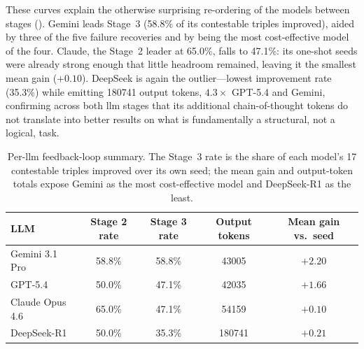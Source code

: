 These curves explain the otherwise surprising re-ordering of the models between stages (). Gemini leads Stage~3 (58.8\% of its contestable triples improved), aided by three of the five failure recoveries and by being the most cost-effective model of the four. Claude, the Stage~2 leader at 65.0\%, falls to 47.1\%: its one-shot seeds were already strong enough that little headroom remained, leaving it the smallest mean gain ($+0.10$). DeepSeek is again the outlier---lowest improvement rate (35.3\%) while emitting \num{180741} output tokens, $4.3\times$ GPT-5.4 and Gemini, confirming across both \gls{llm} stages that its additional chain-of-thought tokens do not translate into better results on what is fundamentally a structural, not a logical, task.

\begin{table}[htbp]
  \centering
  \caption{Per-\gls{llm} feedback-loop summary. The Stage~3 rate is the share of each model's 17 contestable triples improved over its own seed; the mean gain and output-token totals expose Gemini as the most cost-effective model and DeepSeek-R1 as the least.}
  \label{tab:s3_llm}
  \small
  \begin{tabular}{l c c c c}
    \toprule
    \textbf{LLM} & \textbf{Stage 2 rate} & \textbf{Stage 3 rate} & \textbf{Output tokens} & \textbf{Mean gain vs.\ seed} \\
    \midrule
    Gemini 3.1 Pro  & 58.8\% & 58.8\% & \num{43005}  & $+2.20$ \\
    GPT-5.4         & 50.0\% & 47.1\% & \num{42035}  & $+1.66$ \\
    Claude Opus 4.6 & 65.0\% & 47.1\% & \num{54159}  & $+0.10$ \\
    DeepSeek-R1     & 50.0\% & 35.3\% & \num{180741} & $+0.21$ \\
    \bottomrule
  \end{tabular}
\end{table}


